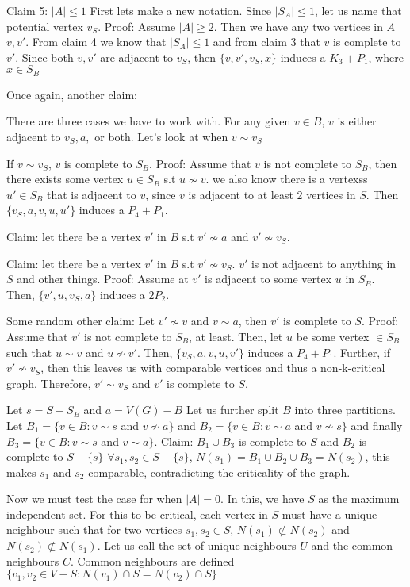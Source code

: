 \documentclass[12pt]{article}
\begin{document}

Claim 5: $|A| \leq 1$
First lets make a new notation. Since $|S_A| \leq 1$, let us name that potential vertex $v_S$.
Proof: Assume $|A| \geq 2$. Then we have any two vertices in $A$ $v, v'$. From claim 4 we know that $|S_A| \leq 1$ and from claim 3 that $v$ is complete to $v'$. Since both $v, v'$ are adjacent to $v_S$, then  $\{v, v', v_S, x \}$ induces a $K_3 + P_1$, where $x \in S_B$

Once again, another claim:

There are three cases we have to work with.
For any given  $v \in B$, $v$ is either adjacent to $v_S, a,$ or both. Let's look at when $v \sim v_S$

If $v \sim v_S$, $v$ is complete to $S_B$. Proof: Assume that $v$ is not complete to $S_B$, then there exists some vertex $u \in S_B$ s.t $u \not \sim v$. we also know there is a vertexss $u' \in S_B$ that is adjacent to $v$, since $v$ is adjacent to at least 2 vertices in $S$. Then $\{v_S, a, v, u, u'\}$ induces a $P_4 + P_1$.

Claim: let there be a vertex $v'$ in $B$ s.t $v' \not \sim a$ and $v' \not \sim v_S$.

Claim: let there be a vertex $v'$ in $B$ s.t $v' \not \sim v_S$. $v'$ is not adjacent to anything in $S$ and other things.
Proof: Assume at $v'$ is adjacent to some vertex $u$ in $S_B$. Then, $\{ v', u, v_S, a \}$ induces a $2P_2$.

Some random other claim: Let $v' \not \sim v$ and $v \sim a$, then $v'$ is complete to $S$.
Proof: Assume that $v'$ is not complete to $S_B$, at least. Then, let $u$ be some vertex $\in S_B$ such that $u \sim v$ and $u \not \sim v'$. Then, $\{v_S, a, v, u, v' \}$ induces a $P_4 + P_1$. Further, if $v' \not \sim v_S$, then this leaves us with comparable vertices and thus a non-k-critical graph. Therefore, $v' \sim v_S$ and $v'$ is complete to $S$.

Let $s = S - S_B$ and $a = V(G) - B$
Let us further split $B$ into three partitions. Let $B_1 = \{v \in B : v \sim s$ and $v \not \sim a \}$ and $B_2  =\{v \in B : v \sim a$ and $v \not \sim s \}$ and finally $B_3 = \{v \in B : v \sim s$ and $v \sim a \}$.
Claim: $B_1 \cup B_3$ is complete to $S$ and $B_2$ is complete to $S - \{s\}$
$\forall s_1, s_2 \in S - \{ s \}$, $N(s_1) = B_1 \cup B_2 \cup B_3 = N(s_2)$, this makes $s_1$ and $s_2$ comparable, contradicting the criticality of the graph.

Now we must test the case for when $|A| = 0$. In this, we have $S$ as the maximum independent set. For this to be critical, each vertex in $S$ must have a unique neighbour such that for two vertices $s_1, s_2 \in S$, $N(s_1) \not \subset N(s_2)$ and $N(s_2) \not \subset N(s_1)$.
Let us call the set of unique neighbours $U$ and the common neighbours $C$.
Common neighbours are defined $\{ v_1, v_2 \in V - S : N(v_1) \cap S = N(v_2) \cap S \}$
\end{document}
